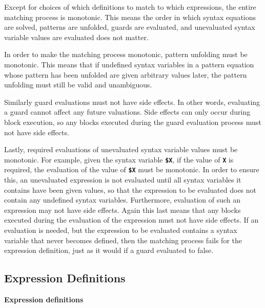 \documentclass[12pt]{article}
\newcommand{\TT}[1]{{\tt \bfseries #1}}
\newcommand{\key}[1]{{\rm \bfseries #1}}
\begin{document}
Except for choices of which definitions to match to which expressions,
the entire matching process is monotonic.  This means the order in which
syntax equations are solved, patterns are unfolded, guards are evaluated,
and unevaluated syntax variable values are evaluated does not matter.

In order to make the matching process monotonic, pattern unfolding must
be monotonic.  This means that if undefined syntax variables in a pattern
equation whose pattern has been unfolded are given arbitrary values later,
the pattern unfolding must still be valid and unambiguous.

Similarly guard evaluations must not have side effects.  In other
words, evaluating a guard cannot affect any future valuations.
Side effects can only occur during block execution, so any blocks
executed during the guard evaluation process must not have side effects.

Lastly, required evaluations of unevaluated syntax variable values
must be monotonic.  For example, given the syntax variable \TT{\$X},
if the value of \TT{X} is required, the evaluation of the value of
\TT{\$X} must be monotonic.
In order to ensure this, an unevaluated expression is not evaluated until
all syntax variables it contains have been given values, so that
the expression to be evaluated does not contain any undefined syntax
variables.  Furthermore, evaluation of such an expression may not have
side effects.  Again this last means that any blocks executed during
the evaluation of the expression must not have side effects.
If an evaluation is needed, but the expression to be evaluated contains
a syntax variable that never becomes defined,
then the matching process fails for the expression definition, just as it
would if a guard evaluated to false.

\subsection{Expression Definitions}
\label{EXPRESSION-DEFINITION}

\key{Expression definitions}
\end{document}
